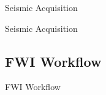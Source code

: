 \addtocounter{footnote}{-1}




\begin{frame}{Seismic Acquisition}


  \begin{figure}
    \def\svgwidth{1.0\linewidth}
    
  \end{figure}

\end{frame}

\begin{frame}[noframenumbering]{Seismic Acquisition}


  \begin{figure}
    \def\svgwidth{1.0\linewidth}
    
  \end{figure}

\end{frame}

\newcommand\hideit[1]{%
  \only<0| handout:1>{\mbox{}}%
  \invisible<0| handout:1>{#1}}







\subsection{FWI Workflow}

\begin{frame}{FWI Workflow}
\small
\vspace{-3.67cm}
\begin{columns}
\column{\dimexpr\paperwidth-10pt}
\begin{figure}
\def\svgwidth{1.0\linewidth}

\end{figure}
\end{columns}
\end{frame}

